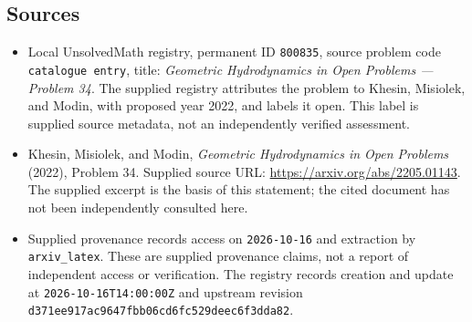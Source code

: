 \documentclass[11pt]{article}
\begin{document}
\subsection{Sources}
\begin{itemize}
\item Local UnsolvedMath registry, permanent ID \texttt{800835}, source problem code \texttt{catalogue entry}, title: \emph{Geometric Hydrodynamics in Open Problems --- Problem 34}. The supplied registry attributes the problem to Khesin, Misiolek, and Modin, with proposed year 2022, and labels it open. This label is supplied source metadata, not an independently verified assessment.
\item Khesin, Misiolek, and Modin, \emph{Geometric Hydrodynamics in Open Problems} (2022), Problem 34. Supplied source URL: \url{https://arxiv.org/abs/2205.01143}. The supplied excerpt is the basis of this statement; the cited document has not been independently consulted here.
\item Supplied provenance records access on \texttt{2026-10-16} and extraction by \texttt{arxiv\_latex}. These are supplied provenance claims, not a report of independent access or verification. The registry records creation and update at \texttt{2026-10-16T14:00:00Z} and upstream revision \texttt{d371ee917ac9647fbb06cd6fc529deec6f3dda82}.
\end{itemize}
\end{document}
